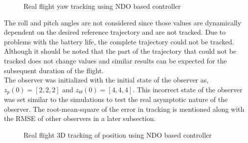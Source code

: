 \documentclass[letterpaper%
, twoside%
, 12pt%
,memoire%
, english%
,creativecommons,hyperref%
]{thETS}
\theoremstyle{newThmStyle}
\begin{document}
\begin{figure}[H]
	\centering
	\parbox{0.85\textwidth}{\caption{Real flight yaw tracking using NDO based controller\label{Fig:yawtracNDO}}}
\end{figure}
The roll and pitch angles are not considered since those values are dynamically dependent on the desired reference trajectory and are not tracked. Due to problems with the battery life, the complete trajectory could not be tracked. Although it should be noted that the part of the trajectory that could not be tracked does not change values and similar results can be expected for the subsequent duration of the flight. \\
The observer was initialized with the initial state of the observer as, $z_p(0)=[2,2,2]$ and $z_\Theta(0)=[4,4,4]$. This incorrect state of the observer was set similar to the simulations to test the real asymptotic nature of the observer. The root-mean-square of the error in tracking is mentioned along with the RMSE of other observers in a later subsection.
\begin{figure}[H]
	\centering
	\parbox{0.85\textwidth}{\caption{Real flight 3D tracking of position using NDO based controller\label{Fig:3dNDO}}}
\end{figure}
\end{document}
